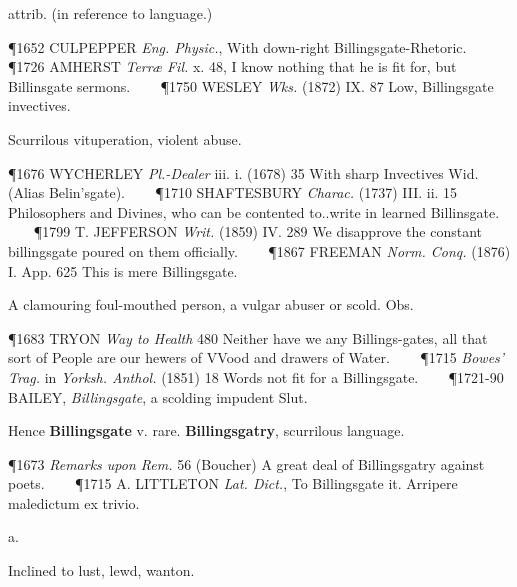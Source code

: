 \begin{description}[wide, labelwidth=!, labelindent=0pt]
\begin{myenumerate}
 attrib. (in reference to language.)

\P 1652 CULPEPPER  \textit{Eng. Physic.}, With down-right Billingsgate-Rhetoric.    
\P 1726 AMHERST  \textit{Terræ Fil.} x. 48, I know nothing that he is fit for, but Billinsgate sermons.    
\P 1750 WESLEY  \textit{Wks.} (1872) IX. 87 Low, Billingsgate invectives.

 Scurrilous vituperation, violent abuse.

\P 1676 WYCHERLEY  \textit{Pl.-Dealer} iii. i. (1678) 35 With sharp Invectives  Wid. (Alias Belin'sgate).    
\P 1710 SHAFTESBURY  \textit{Charac.} (1737) III. ii. 15 Philosophers and Divines, who can be contented to..write in learned Billinsgate.    
\P 1799 T. JEFFERSON  \textit{Writ.} (1859) IV. 289 We disapprove the constant billingsgate poured on them officially.    
\P 1867 FREEMAN  \textit{Norm. Conq.} (1876) I. App. 625 This is mere Billingsgate.

 A clamouring foul-mouthed person, a vulgar abuser or scold. Obs.

\P 1683 TRYON  \textit{Way to Health} 480 Neither have we any Billings-gates, all that sort of People are our hewers of VVood and drawers of Water.    
\P 1715 \textit{Bowes' Trag.} in  \textit{Yorksh. Anthol.} (1851) 18 Words not fit for a Billingsgate.    
\P 1721-90 BAILEY,  \textit{Billingsgate}, a scolding impudent Slut.

\noindent Hence \textbf{Billingsgate} v. rare. \textbf{Billingsgatry}, scurrilous language.

\P 1673 \textit{Remarks  upon Rem.} 56 (Boucher) A great deal of Billingsgatry against poets.    
\P 1715 A. LITTLETON  \textit{Lat. Dict.}, To Billingsgate it. Arripere maledictum ex trivio.
\end{myenumerate}


 a.

\noindent {}

\vspace{-0.3cm}

\begin{myenumerate}

 Inclined to lust, lewd, wanton.


\end{myenumerate}
\end{description}
